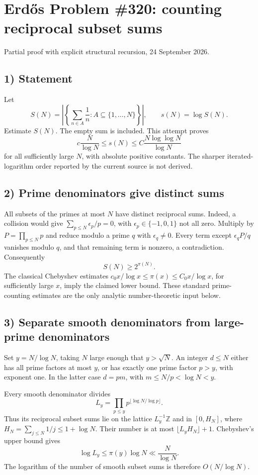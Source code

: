 \section{Erd\H{o}s Problem \#320: counting reciprocal subset sums}
\noindent Partial proof with explicit structural recursion, 24 September 2026.

\subsection*{1) Statement}
Let
\[S(N)=\left|\left\{\sum_{n\in A}\frac1n:A\subseteq\{1,\ldots,N\}\right\}\right|,\qquad s(N)=\log S(N).
\]
Estimate $S(N)$. The empty sum is included. This attempt proves
\[c\frac N{\log N}\le s(N)\le C\frac{N\log\log N}{\log N}\]
for all sufficiently large $N$, with absolute positive constants. The sharper iterated-logarithm order reported by the current source is not derived.

\subsection*{2) Prime denominators give distinct sums}
All subsets of the primes at most $N$ have distinct reciprocal sums. Indeed, a collision would give $\sum_{p\le N}\epsilon_p/p=0$, with $\epsilon_p\in\{-1,0,1\}$ not all zero. Multiply by $P=\prod_{p\le N}p$ and reduce modulo a prime $q$ with $\epsilon_q\ne0$. Every term except $\epsilon_qP/q$ vanishes modulo $q$, and that remaining term is nonzero, a contradiction. Consequently
\[S(N)\ge2^{\pi(N)}.\]
The classical Chebyshev estimates $c_0x/\log x\le\pi(x)\le C_0x/\log x$, for sufficiently large $x$, imply the claimed lower bound. These standard prime-counting estimates are the only analytic number-theoretic input below.

\subsection*{3) Separate smooth denominators from large-prime denominators}
Set $y=N/\log N$, taking $N$ large enough that $y>\sqrt N$. An integer $d\le N$ either has all prime factors at most $y$, or has exactly one prime factor $p>y$, with exponent one. In the latter case $d=pm$, with $m\le N/p<\log N<y$.

Every smooth denominator divides
\[L_y=\prod_{p\le y}p^{\lfloor\log N/\log p\rfloor}.
\]
Thus its reciprocal subset sums lie on the lattice $L_y^{-1}\mathbb Z$ and in $[0,H_N]$, where $H_N=\sum_{j\le N}1/j\le1+\log N$. Their number is at most $\lfloor L_yH_N\rfloor+1$. Chebyshev's upper bound gives
\[\log L_y\le\pi(y)\log N\ll\frac{N}{\log N}.
\]
The logarithm of the number of smooth subset sums is therefore $O(N/\log N)$.

